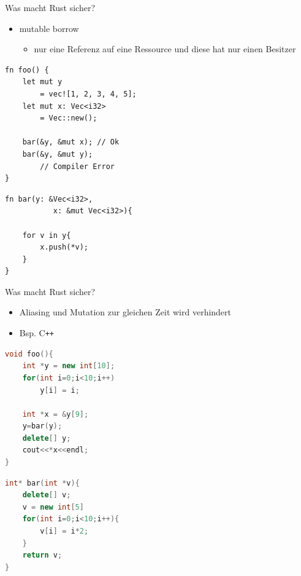 \documentclass[12pt]{beamer}
\begin{document}
\begin{frame}[fragile=singleslide]{Was macht Rust sicher?}
	\begin{itemize}
	    \item mutable borrow  
	    \begin{itemize}
	        \item nur eine Referenz auf eine Ressource und diese hat nur einen Besitzer
	    \end{itemize}
	\end{itemize}
\begin{center}
\hspace{3pt}
\begin{minipage}[t]{.48\textwidth}
\begin{lstlisting}
fn foo() {	
	let mut y 
		= vec![1, 2, 3, 4, 5];
	let mut x: Vec<i32> 
		= Vec::new();
		
	bar(&y, &mut x); // Ok
	bar(&y, &mut y); 
		// Compiler Error
}
\end{lstlisting}				
\end{minipage}
\hspace{3pt}
\begin{minipage}[t]{.47\textwidth}
\begin{lstlisting}
fn bar(y: &Vec<i32>, 
		   x: &mut Vec<i32>){
	
	for v in y{
		x.push(*v);
	}
}
\end{lstlisting}				
\end{minipage}
\end{center}
\end{frame}

\begin{frame}[fragile=singleslide]{Was macht Rust sicher?}
\begin{itemize}
    \item Aliasing und Mutation zur gleichen Zeit wird verhindert
   	\item Bsp. C\texttt{++}   	
\end{itemize}
\begin{center}
\hspace{3pt}
\begin{minipage}[t]{.47\textwidth}
\begin{lstlisting}[language=C++,otherkeywords={}]
void foo(){ 
	int *y = new int[10];	
	for(int i=0;i<10;i++)
		y[i] = i;

	int *x = &y[9];
	y=bar(y);	
	delete[] y;		
	cout<<*x<<endl;
}
\end{lstlisting}				
\end{minipage}
\hspace{3pt}
\begin{minipage}[t]{.47\textwidth}
\begin{lstlisting}[language=C++,otherkeywords={}]
int* bar(int *v){
	delete[] v;	
	v = new int[5]	
	for(int i=0;i<10;i++){
		v[i] = i*2;
	}	
	return v;
}
\end{lstlisting}				
\end{minipage}
\end{center}
\end{frame}
\end{document}
